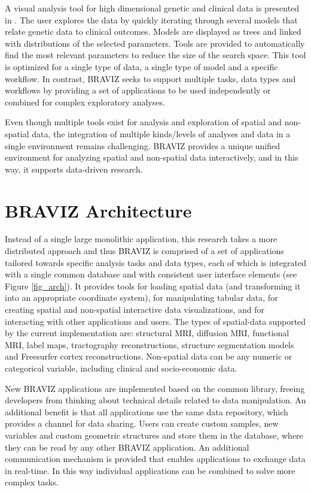 \documentclass{frontiersHLTH}
\begin{document}
A visual analysis tool for high dimensional genetic and clinical data is presented in \cite{hinterberg_peax:_2014}. The user explores the data by quickly iterating through several models that relate genetic data to clinical outcomes. Models are displayed as trees and linked with distributions of the selected parameters. Tools are provided to automatically find the most relevant parameters to reduce the size of the search space. This tool is optimized for a single type of data, a single type of model and a specific workflow. In contrast, BRAVIZ seeks to support multiple tasks, data types and workflows by providing a set of  applications to be used independently or combined for complex exploratory analyses.
	
Even though multiple tools  exist for analysis and exploration of spatial and non-spatial data, the integration of multiple kinds/levels of analyses and data in a single environment remains challenging. BRAVIZ provides a unique unified environment for analyzing spatial and non-spatial data interactively, and in this way, it supports data-driven research.

\section{BRAVIZ Architecture}

Instead of a single large monolithic application, this research takes a more distributed approach and thus BRAVIZ is comprised of a set of applications tailored towards specific analysis tasks and data types, each of which is integrated with a single common database and with consistent user interface elements (see Figure \ref{fig_arch}). It provides tools for loading spatial data (and transforming it into an appropriate coordinate system), for manipulating tabular data, for creating spatial and non-spatial interactive data visualizations, and for interacting with other applications and users. The types of spatial-data supported by the current implementation are: structural MRI, diffusion MRI, functional MRI, label maps, tractography reconstructions, structure segmentation models and Freesurfer cortex reconstructions. Non-spatial data can be any numeric or categorical variable, including clinical and socio-economic data.

New BRAVIZ applications are implemented based on the common library, freeing developers from thinking about technical details related to data manipulation. An additional benefit is that all applications use the same data repository, which provides a channel for data sharing. Users can create custom samples, new variables and custom geometric structures and store them in the database, where they can be read by any other BRAVIZ application. An additional communication mechanism is provided that enables applications to exchange data in real-time. In this way individual applications can be combined to solve more complex tasks.
\end{document}
